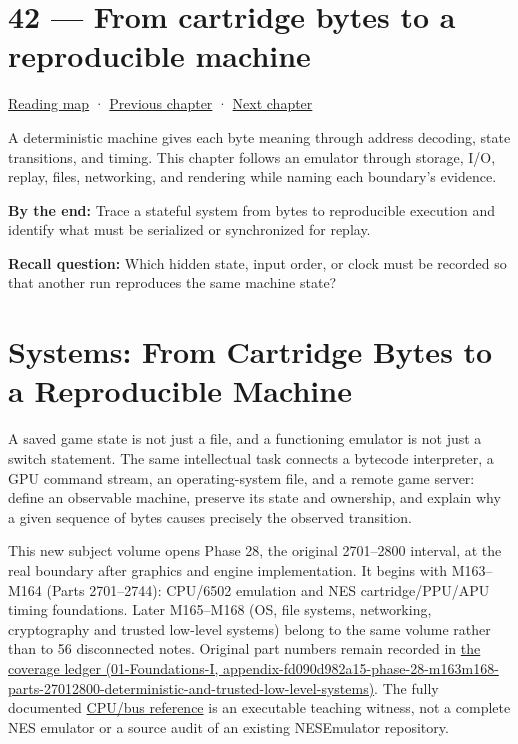 \hypertarget{06-engine-ii-ch042}{}
\chapter{42 --- From cartridge bytes to a reproducible machine}\label{06-engine-ii-ch042-from-cartridge-bytes-to-a-reproducible-machine}

\hyperref[volume-reading-map]{Reading map} · \hyperref[06-engine-ii-ch041]{Previous chapter} · \hyperref[06-engine-ii-ch043]{Next chapter}

A deterministic machine gives each byte meaning through address decoding, state transitions, and timing. This chapter follows an emulator through storage, I/O, replay, files, networking, and rendering while naming each boundary's evidence.

\textbf{By the end:} Trace a stateful system from bytes to reproducible execution and identify what must be serialized or synchronized for replay.

\textbf{Recall question:} Which hidden state, input order, or clock must be recorded so that another run reproduces the same machine state?

\chapter{Systems: From Cartridge Bytes to a Reproducible Machine}\label{06-engine-ii-ch042-systems-from-cartridge-bytes-to-a-reproducible-machine}

A saved game state is not just a file, and a functioning emulator is not just a switch statement. The same intellectual task connects a bytecode interpreter, a GPU command stream, an operating-system file, and a remote game server: define an observable machine, preserve its state and ownership, and explain why a given sequence of bytes causes precisely the observed transition.

This new subject volume opens Phase 28, the original 2701--2800 interval, at the real boundary after graphics and engine implementation. It begins with M163--M164 (Parts 2701--2744): CPU/6502 emulation and NES cartridge/PPU/APU timing foundations. Later M165--M168 (OS, file systems, networking, cryptography and trusted low-level systems) belong to the same volume rather than to 56 disconnected notes. Original part numbers remain recorded in \href{../01-Foundations-I/main.pdf\#nameddest=appendix-fd090d982a15-phase-28-m163m168-parts-27012800-deterministic-and-trusted-low-level-systems}{the coverage ledger (01-Foundations-I, appendix-fd090d982a15-phase-28-m163m168-parts-27012800-deterministic-and-trusted-low-level-systems)}. The fully documented \hyperref[source-file-552a9e2296dc984412c8f06d]{CPU/bus reference} is an executable teaching witness, not a complete NES emulator or a source audit of an existing NESEmulator repository.

